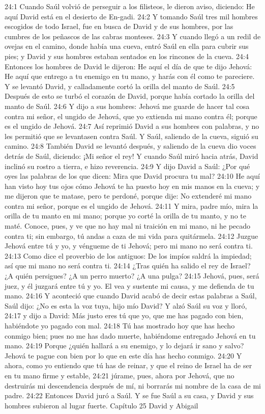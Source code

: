 24:1 Cuando Saúl volvió de perseguir a los filisteos, le dieron aviso, diciendo: He aquí David está en el desierto de En-gadi.  
24:2 Y tomando Saúl tres mil hombres escogidos de todo Israel, fue en busca de David y de sus hombres, por las cumbres de los peñascos de las cabras monteses.  
24:3 Y cuando llegó a un redil de ovejas en el camino, donde había una cueva, entró Saúl en ella para cubrir sus pies; y David y sus hombres estaban sentados en los rincones de la cueva.  
24:4 Entonces los hombres de David le dijeron: He aquí el día de que te dijo Jehová: He aquí que entrego a tu enemigo en tu mano, y harás con él como te pareciere. Y se levantó David, y calladamente cortó la orilla del manto de Saúl.  
24:5 Después de esto se turbó el corazón de David, porque había cortado la orilla del manto de Saúl.  
24:6 Y dijo a sus hombres: Jehová me guarde de hacer tal cosa contra mi señor, el ungido de Jehová, que yo extienda mi mano contra él; porque es el ungido de Jehová.  
24:7 Así reprimió David a sus hombres con palabras, y no les permitió que se levantasen contra Saúl. Y Saúl, saliendo de la cueva, siguió su camino.  
24:8 También David se levantó después, y saliendo de la cueva dio voces detrás de Saúl, diciendo: ¡Mi señor el rey! Y cuando Saúl miró hacia atrás, David inclinó su rostro a tierra, e hizo reverencia.  
24:9 Y dijo David a Saúl: ¿Por qué oyes las palabras de los que dicen: Mira que David procura tu mal?  
24:10 He aquí han visto hoy tus ojos cómo Jehová te ha puesto hoy en mis manos en la cueva; y me dijeron que te matase, pero te perdoné, porque dije: No extenderé mi mano contra mi señor, porque es el ungido de Jehová.  
24:11 Y mira, padre mío, mira la orilla de tu manto en mi mano; porque yo corté la orilla de tu manto, y no te maté. Conoce, pues, y ve que no hay mal ni traición en mi mano, ni he pecado contra ti; sin embargo, tú andas a caza de mi vida para quitármela.  
24:12 Juzgue Jehová entre tú y yo, y véngueme de ti Jehová; pero mi mano no será contra ti.  
24:13 Como dice el proverbio de los antiguos: De los impíos saldrá la impiedad; así que mi mano no será contra ti.  
24:14 ¿Tras quién ha salido el rey de Israel? ¿A quién persigues? ¿A un perro muerto? ¿A una pulga?  
24:15 Jehová, pues, será juez, y él juzgará entre tú y yo. El vea y sustente mi causa, y me defienda de tu mano.  
24:16 Y aconteció que cuando David acabó de decir estas palabras a Saúl, Saúl dijo: ¿No es esta la voz tuya, hijo mío David? Y alzó Saúl su voz y lloró,  
24:17 y dijo a David: Más justo eres tú que yo, que me has pagado con bien, habiéndote yo pagado con mal.  
24:18 Tú has mostrado hoy que has hecho conmigo bien; pues no me has dado muerte, habiéndome entregado Jehová en tu mano.  
24:19 Porque ¿quién hallará a su enemigo, y lo dejará ir sano y salvo? Jehová te pague con bien por lo que en este día has hecho conmigo.  
24:20 Y ahora, como yo entiendo que tú has de reinar, y que el reino de Israel ha de ser en tu mano firme y estable,  
24:21 júrame, pues, ahora por Jehová, que no destruirás mi descendencia después de mí, ni borrarás mi nombre de la casa de mi padre.  
24:22 Entonces David juró a Saúl. Y se fue Saúl a su casa, y David y sus hombres subieron al lugar fuerte.  
Capítulo 25 
David y Abigail  

